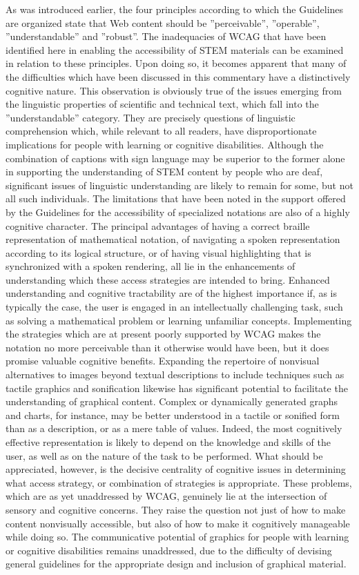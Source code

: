 \documentclass{sig-alternate} %
\begin{document}
\begin{large}
As was introduced earlier, the four principles according to which the Guidelines are organized state that Web content should be ”perceivable”, ”operable”, ”understandable” and ”robust”. The inadequacies of WCAG that have been identified here in enabling the accessibility of STEM materials can be examined in relation to these principles. Upon doing so, it becomes apparent that many of the difficulties which have been discussed in this commentary have a distinctively cognitive nature. This observation is obviously true of the issues emerging from the linguistic properties of scientific and technical text, which fall into the ”understandable” category. They are precisely questions of linguistic comprehension which, while relevant to all readers, have disproportionate implications for people with learning or cognitive disabilities. Although the combination of captions with sign language may be superior to the former alone in supporting the understanding of STEM content by people who are deaf, significant issues of linguistic understanding are likely to remain for some, but not all such individuals. The limitations that have been noted in the support offered by the Guidelines for the accessibility of specialized notations are also of a highly cognitive character. The principal advantages of having a correct braille representation of mathematical notation, of navigating a spoken representation according to its logical structure, or of having visual highlighting that is synchronized with a spoken rendering, all lie in the enhancements of understanding which these access strategies are intended to bring. Enhanced understanding and cognitive tractability are of the highest importance if, as is typically the case, the user is engaged in an intellectually challenging task, such as solving a mathematical problem or learning unfamiliar concepts. Implementing the strategies which are at present poorly supported by WCAG makes the notation no more perceivable than it otherwise would have been, but it does promise valuable cognitive benefits. Expanding the repertoire of nonvisual alternatives to images beyond textual descriptions to include techniques such as tactile graphics and sonification likewise has significant potential to facilitate the understanding of graphical content. Complex or dynamically generated graphs and charts, for instance, may be better understood in a tactile or sonified form than as a description, or as a mere table of values. Indeed, the most cognitively effective representation is likely to depend on the knowledge and skills of the user, as well as on the nature of the task to be performed. What should be appreciated, however, is the decisive centrality of cognitive issues in determining what access strategy, or combination of strategies is appropriate. These problems, which are as yet unaddressed by WCAG, genuinely lie at the intersection of sensory and cognitive concerns. They raise the question not just of how to make content nonvisually accessible, but also of how to make it cognitively manageable while doing so. The communicative potential of graphics for people with learning or cognitive disabilities remains unaddressed, due to the difficulty of devising general guidelines for the appropriate design and inclusion of graphical material.


\end{large}
\end{document}
